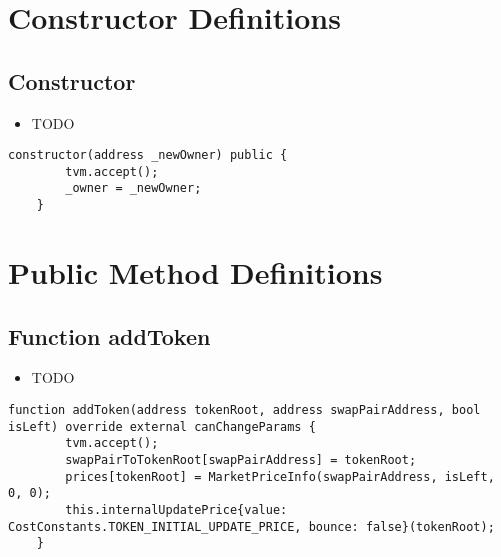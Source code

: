 \section{Constructor Definitions}


\subsection{Constructor}

\noindent\begin{itemize}
\item TODO
\end{itemize}

\begin{lstlisting}[firstnumber=36]
    constructor(address _newOwner) public {
        tvm.accept();
        _owner = _newOwner;
    }
\end{lstlisting}

\section{Public Method Definitions}


\subsection{Function addToken}

\noindent\begin{itemize}
\item TODO
\end{itemize}

\begin{lstlisting}[firstnumber=179]
    function addToken(address tokenRoot, address swapPairAddress, bool isLeft) override external canChangeParams {
        tvm.accept();
        swapPairToTokenRoot[swapPairAddress] = tokenRoot;
        prices[tokenRoot] = MarketPriceInfo(swapPairAddress, isLeft, 0, 0);
        this.internalUpdatePrice{value: CostConstants.TOKEN_INITIAL_UPDATE_PRICE, bounce: false}(tokenRoot);
    }
\end{lstlisting}

